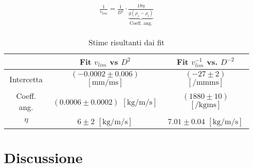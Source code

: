 \documentclass[a4paper,11pt,oneside]{article}
\begin{document}
\begin{align*}
\begin{split}
     \frac{1}{v_{lim}}= \frac{1}{D^{2}} \cdot \underbrace{\frac{18 \eta}{g (\rho_s - \rho_l)}}_\text{Coeff. ang.}
\end{split}
\end{align*}


\begin{figure}[h!]
    \centering
    \caption*{}
\end{figure}


\begin{table}[h!] %
\centering
    \begin{tabular}{|c|c|c|} \hline
        & Fit $v_{lim}$ vs $D^{2}$ & Fit $v_{lim}^{-1}$ vs. $D^{-2}$ \\ \hline
        \rowcolor[rgb]{0.85,0.85,0.85}Intercetta & $(-0.0002 \pm 0.006)$ $[\si{\milli\metre\per\milli\second}]$& $(-27 \pm 2)$ $[\si{\per\milli\metre\milli\second}]$\\ \hline
        Coeff. ang.  & $(0.0006 \pm 0.0002)$ $[\si{\kilo\gram\per\metre\per\second}]$ & $(1880 \pm 10)$ $[\si{\per\kilo\gram\metre\second}]$\\ \hline
        \rowcolor[rgb]{0.85,0.85,0.85}$\eta$  & $6 \pm 2$ $[\si{\kilo\gram\per\metre\per\second}]$& $7.01 \pm 0.04$ $[\si{\kilo\gram\per\metre\per\second}]$\\ \hline
    \end{tabular}
\caption{Stime risultanti dai fit}
\label{tab:fit}
\end{table}


\section{Discussione}
\end{document}
